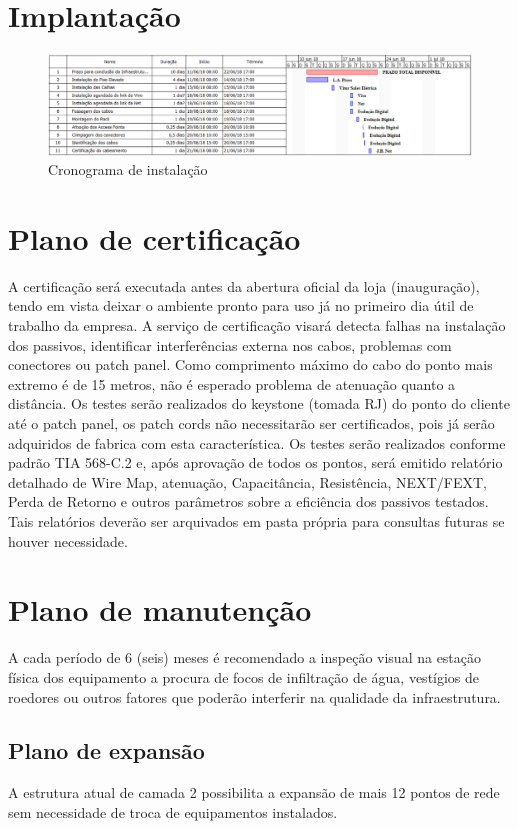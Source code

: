 \documentclass[	DIV=calc,%
							paper=a4,%
							fontsize=12pt,%
							onecolumn]{scrartcl}	 					%
\begin{document}
\section{Implantação}

\begin{figure}[H]
	\centering
	\includegraphics[width=\textwidth]{Cronograma}
	\caption{Cronograma de instalação}
	\label{fig5}
\end{figure}

\section{Plano de certificação}
A certificação será executada antes da abertura oficial da loja (inauguração), tendo em vista deixar o ambiente pronto para uso já no primeiro dia útil de trabalho da empresa. A serviço de certificação visará detecta falhas na instalação dos passivos, identificar interferências externa nos cabos, problemas com conectores ou patch panel.
Como comprimento máximo do cabo do ponto mais extremo é de 15 metros, não é esperado problema de atenuação quanto a distância.
Os testes serão realizados do keystone (tomada RJ) do ponto do cliente até o patch panel, os patch cords não necessitarão ser certificados, pois já serão adquiridos de fabrica com esta característica.
Os testes serão realizados conforme padrão TIA 568-C.2 e, após aprovação de todos os pontos, será emitido relatório detalhado de Wire Map, atenuação, Capacitância, Resistência, NEXT/FEXT, Perda de Retorno e outros parâmetros sobre a eficiência dos passivos testados. Tais relatórios deverão ser arquivados em pasta própria para consultas futuras se houver necessidade.

\section{Plano de manutenção}
A cada período de 6 (seis) meses é recomendado a inspeção visual na estação física dos equipamento a procura de focos de infiltração de água, vestígios de roedores ou outros fatores que poderão interferir na qualidade da infraestrutura. 


\subsection{Plano de expansão}
A estrutura atual de camada 2 possibilita a expansão de mais 12 pontos de rede sem necessidade de troca de equipamentos instalados.
\end{document}
